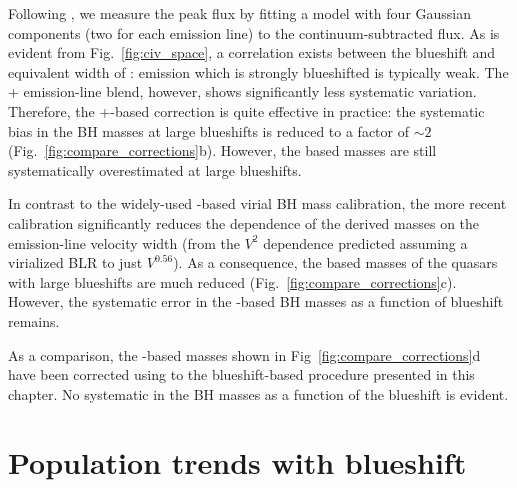 Following \citet{runnoe13}, we measure the peak flux by fitting a model with four Gaussian components (two for each emission line) to the continuum-subtracted flux.
As is evident from Fig.~\ref{fig:civ_space}, a correlation exists between the blueshift and equivalent width of :  emission which is strongly blueshifted is typically weak. 
The + emission-line blend, however, shows significantly less systematic variation. 
Therefore, the +-based correction is quite effective in practice: the systematic bias in the  BH masses at large  blueshifts is reduced to a factor of $\sim2$ (Fig.~\ref{fig:compare_corrections}b).
However, the  based masses are still systematically overestimated at large  blueshifts. 

In contrast to the widely-used \citet{vestergaard06} -based virial BH mass calibration, the more recent \citet{park13} calibration significantly reduces the dependence of the derived masses on the emission-line velocity width (from the $V^2$ dependence predicted assuming a virialized BLR to just $V^{0.56}$).
As a consequence, the  based masses of the quasars with large  blueshifts are much reduced (Fig.~\ref{fig:compare_corrections}c).
However, the systematic error in the -based BH masses as a function of  blueshift remains. 

As a comparison, the -based masses shown in Fig~\ref{fig:compare_corrections}d have been corrected using to the  blueshift-based procedure presented in this chapter. 
No systematic in the BH masses as a function of the  blueshift is evident. 

\section{Population trends with  blueshift}
\label{sec:hatrends}

